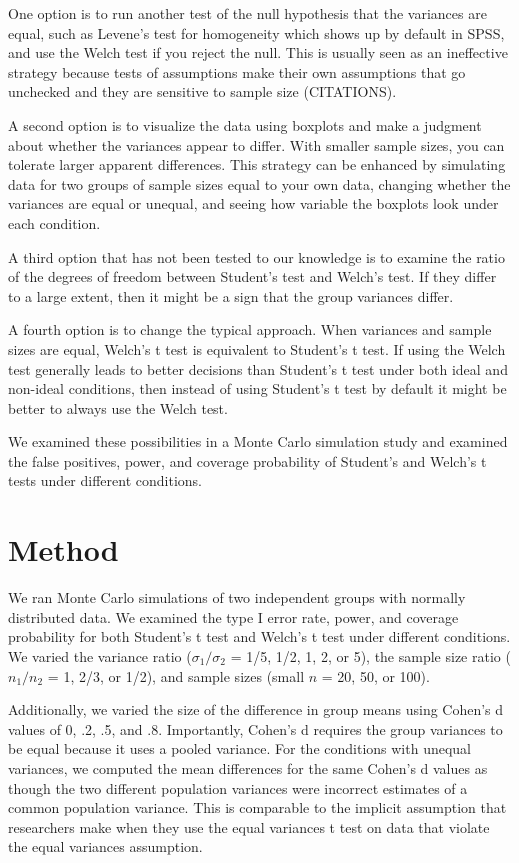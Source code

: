 \documentclass[man,a4paper,noextraspace,apacite]{apa6}\usepackage[]{graphicx}\usepackage[]{color}
\begin{document}
    One option is to run another test of the null hypothesis that the variances are equal, such as Levene's test for homogeneity which shows up by default in SPSS, and use the Welch test if you reject the null. This is usually seen as an ineffective strategy because tests of assumptions make their own assumptions that go unchecked and they are sensitive to sample size (CITATIONS). 

    A second option is to visualize the data using boxplots and make a judgment about whether the variances appear to differ. With smaller sample sizes, you can tolerate larger apparent differences. This strategy can be enhanced by simulating data for two groups of sample sizes equal to your own data, changing whether the variances are equal or unequal, and seeing how variable the boxplots look under each condition. 

    A third option that has not been tested to our knowledge is to examine the ratio of the degrees of freedom between Student's test and Welch's test. If they differ to a large extent, then it might be a sign that the group variances differ.

    A fourth option is to change the typical approach. When variances and sample sizes are equal, Welch's t test is equivalent to Student's t test. If using the Welch test generally leads to better decisions than Student's t test under both ideal and non-ideal conditions, then instead of using Student's t test by default it might be better to always use the Welch test.
    
    We examined these possibilities in a Monte Carlo simulation study and examined the false positives, power, and coverage probability of Student's and Welch's t tests under different conditions. 

\section{Method}
    We ran Monte Carlo simulations of two independent groups with normally distributed data. We examined the type I error rate, power, and coverage probability for both Student's t test and Welch's t test under different conditions. We varied the variance ratio ($\sigma_{1}/\sigma_{2}$ = 1/5, 1/2, 1, 2, or 5), the sample size ratio ($n_{1}/n_{2}$ = 1, 2/3, or 1/2), and sample sizes (small $n$ = 20, 50, or 100). 
    
    Additionally, we varied the size of the difference in group means using Cohen's d values of 0, .2, .5, and .8. Importantly, Cohen's d requires the group variances to be equal because it uses a pooled variance. For the conditions with unequal variances, we computed the mean differences for the same Cohen's d values as though the two different population variances were incorrect estimates of a common population variance. This is comparable to the implicit assumption that researchers make when they use the equal variances t test on data that violate the equal variances assumption.
    
\end{document}
